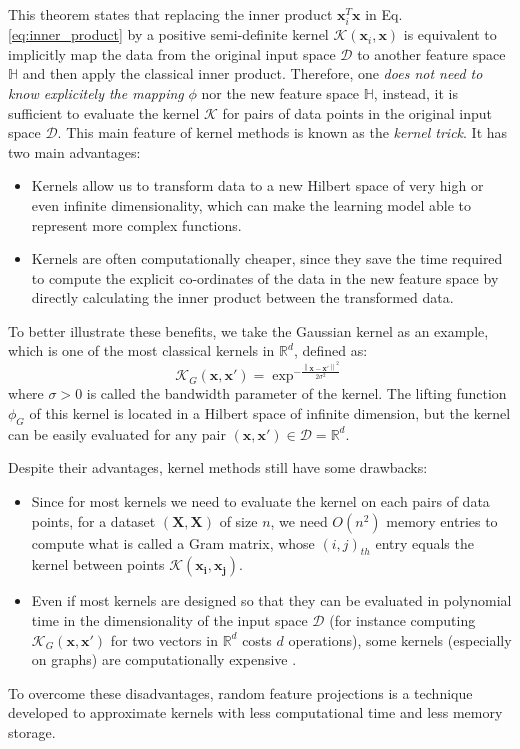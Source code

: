 This theorem states that replacing the inner product $\mathbf{x}_i^T\mathbf{x}$ in Eq. \ref{eq:inner_product} by a positive semi-definite kernel $\mathcal{K}(\mathbf{x}_i,\mathbf{x})$ is equivalent to implicitly map the data from the original input space $\mathcal{D}$ to another feature space $\mathbb{H}$ and then apply the classical inner product. Therefore, one \emph{does not need to know explicitely the mapping} $\phi$ nor the new feature space $\mathbb{H}$, instead, it is sufficient to evaluate the kernel $\mathcal{K}$ for pairs of data points in the original input space $\mathcal{D}$. This main feature of kernel methods is known as the \emph{kernel trick}. It has two main advantages:
\begin{itemize}
    \item Kernels allow us to transform data to a new Hilbert space of very high or even infinite dimensionality, which can make the learning model able to represent more complex functions.
    \item Kernels are often computationally cheaper, since they save the time required to compute the explicit co-ordinates of the data in the new feature space by directly calculating the inner product between the transformed data.
\end{itemize}
To better illustrate these benefits, we take the Gaussian kernel as an example, which is one of the most classical kernels in $\mathbb{R}^d$, defined as:
\begin{equation}
\label{eq:Guassian_kernel}
    \mathcal{K}_{G}(\mathbf{x},\mathbf{x}')=\exp^{-\frac{\left \| \mathbf{x}-\mathbf{x}'\right\|^2}{2\sigma^2}}
\end{equation}
where $\sigma>0$ is called the bandwidth parameter of the kernel. The lifting function $\phi_G$ of this kernel is located in a Hilbert space of infinite dimension, but the kernel can be easily evaluated for any pair $(\mathbf{x},\mathbf{x}')\in \mathcal{D}=\mathbb{R}^d$.

Despite their advantages, kernel methods still have some drawbacks:
\begin{itemize}
    \item Since for most kernels we need to evaluate the kernel on each pairs of data points, for a dataset $(\mathbf{X},\mathbf{X})$  of size $n$, we need $O(n^2)$ memory entries to compute what is called a Gram matrix, whose $(i,j)_{th}$ entry equals the kernel between points $\mathcal{K}(\mathbf{x_i}, \mathbf{x_j})$.
    \item Even if most kernels are designed so that they can be evaluated in polynomial time in the dimensionality of the input space $\mathcal{D}$ (for instance computing $\mathcal{K}_{G}(\mathbf{x},\mathbf{x}')$ for two vectors in $\mathbb{R}^d$ costs $d$ operations),  some kernels (especially on graphs) are computationally expensive \citep{graphlet_kernel}.
\end{itemize}
To overcome these disadvantages, random feature projections is a technique developed to approximate kernels with less computational time and less memory storage. 

